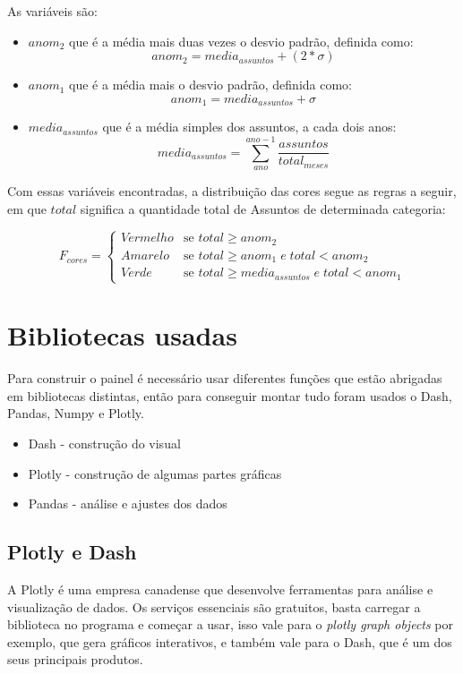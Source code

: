 As variáveis são:
\begin{itemize}
	\item $anom_2$ que é a média mais duas vezes o desvio padrão, definida como: $$anom_2 = media_{assuntos} + (2*\sigma)$$
	
	\item $anom_1$ que é a média mais o desvio padrão, definida como: $$anom_1 = media_{assuntos} + \sigma$$
	
	\item $media_{assuntos}$ que é a média simples dos assuntos, a cada dois anos:
	$$media_{assuntos} = \sum\limits_{ano}^{ano-1}\frac{assuntos}{total_{meses}}$$
\end{itemize}

Com essas variáveis encontradas, a distribuição das cores segue as regras a seguir, em que $total$ significa a quantidade total de Assuntos de determinada categoria:

\begin{equation}
	F_{cores} =
	\begin{cases}
		Vermelho & \text{se $total \geq anom_2$}\\
		Amarelo & \text{se $total \geq anom_1 \;e\; total < anom_2$}\\
		Verde & \text{se $total \geq media_{assuntos} \;e\; total < anom_1$}
	\end{cases}       
\end{equation}

\section{Bibliotecas usadas}

Para construir o painel é necessário usar diferentes funções que estão abrigadas em bibliotecas distintas, então para conseguir montar tudo foram usados o Dash, Pandas, Numpy e Plotly. 

\begin{itemize}
	\item Dash - construção do visual
	\item Plotly - construção de algumas partes gráficas
	\item Pandas - análise e ajustes dos dados
\end{itemize}

\subsection{Plotly e Dash}

A Plotly é uma empresa canadense que desenvolve ferramentas para análise e visualização de dados. Os serviços essenciais são gratuitos, basta carregar a biblioteca no programa e começar a usar, isso vale para o \textit{plotly graph objects} por exemplo, que gera gráficos interativos, e também vale para o Dash, que é um dos seus principais produtos. 


